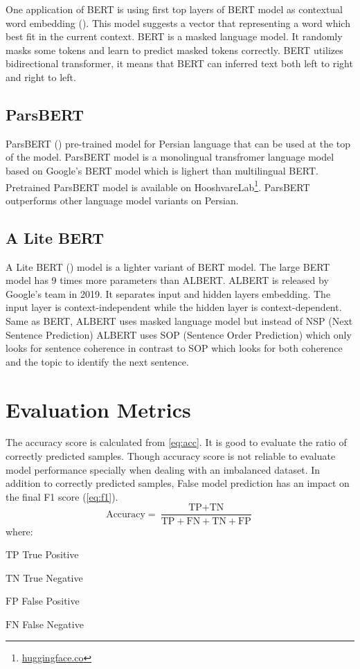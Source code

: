 One application of \ac{BERT} is using first top layers of \ac{BERT} model as contextual word embedding (\cite{book_datafake}). This model suggests a vector that representing a word which best fit in the current context.  \ac{BERT} is a masked language model. It randomly masks some tokens and learn to predict masked tokens correctly. \ac{BERT} utilizes bidirectional transformer, it means that \ac{BERT} can inferred text both left to right and right to left.

\subsection{ParsBERT}
ParsBERT (\cite{parsbert}) pre-trained model for Persian language that can be used at the top of the model. \ac{ParsBERT} model is a monolingual transfromer language model based on Google's \ac{BERT} model \cite{bert} which is lighert than multilingual \ac{BERT}. Pretrained \ac{ParsBERT} model is available on HooshvareLab\footnote{\href{https://huggingface.co/HooshvareLab}{huggingface.co}}. \ac{ParsBERT} outperforms other language model variants on Persian.

\subsection{A Lite BERT}
A Lite BERT (\cite{albert}) model is a lighter variant of \ac{BERT} model. The large \ac{BERT} model has 9 times more parameters than \ac{ALBERT}. \ac{ALBERT} is released by Google's team in 2019. It separates input and hidden layers embedding. The input layer is context-independent while the hidden layer is context-dependent. Same as \ac{BERT}, \ac{ALBERT} uses masked language model but instead of NSP (Next Sentence Prediction) \ac{ALBERT} uses SOP (Sentence Order Prediction) which only looks for sentence coherence in contrast to SOP which looks for both coherence and the topic to identify the next sentence.

 

\section{Evaluation Metrics}
\label{lr:evalmetrics}
The accuracy score is calculated from \ref{eq:acc}. It is good to evaluate the ratio of correctly predicted samples. Though accuracy score is not reliable to evaluate model performance specially when dealing with an imbalanced dataset. In addition to correctly predicted samples, False model prediction has an impact on the final F1 score (\ref{eq:f1}).   
\begin{equation}
\label{eq:acc}
\text{Accuracy} = \frac{\text{TP} + \text{TN} }{\text{TP} + \text{FN} + \text{TN} + \text{FP}}
\end{equation}
where:
\begin{eqexpl}[25mm]
	\item{$\text{TP}$} True Positive
	\item{$\text{TN}$} True Negative
	\item{$\text{FP}$} False Positive 
	\item{$\text{FN}$} False Negative
\end{eqexpl}

